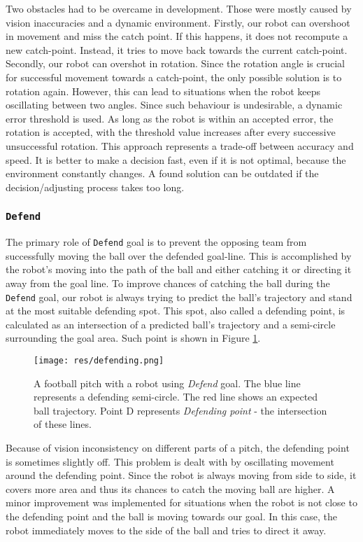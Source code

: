 Two obstacles had to be overcame in development. Those were mostly caused by
vision inaccuracies and a dynamic environment. Firstly, our robot can overshoot
in movement and miss the catch point. If this happens, it does not recompute a
new catch-point. Instead, it tries to move back towards the current
catch-point. Secondly, our robot can overshot in rotation. Since the rotation
angle is crucial for successful movement towards a catch-point, the only
possible solution is to rotation again. However, this can lead to situations
when the robot keeps oscillating between two angles. Since such behaviour is
undesirable, a dynamic error threshold is used. As long as the robot is within
an accepted error, the rotation is accepted, with the threshold value increases
after every successive unsuccessful rotation. This approach represents a
trade-off between accuracy and speed. It is better to make a decision fast,
even if it is not optimal, because the environment constantly changes. A found
solution can be outdated if the decision/adjusting process takes too long.

\subsubsection{\texttt{Defend}}

The primary role of \texttt{Defend} goal is to prevent the opposing team from
successfully moving the ball over the defended goal-line. This is accomplished
by the robot's moving into the path of the ball and either catching it or
directing it away from the goal line. To improve chances of catching the ball
during the \texttt{Defend} goal, our robot is always trying to predict the
ball's trajectory and stand at the most suitable defending spot. This spot,
also called a defending point, is calculated as an intersection of a predicted
ball's trajectory and a semi-circle surrounding the goal area. Such point is
shown in Figure \ref{fig:defendingpoint}.

\begin{figure}[H]
	\begin{center}
    \texttt{[image: res/defending.png]}
    \caption{A football pitch with a robot using \emph{Defend} goal. The blue line represents a defending semi-circle. The red line shows an expected ball trajectory. Point D represents \emph{Defending point} - the intersection of these lines.}
    \label{fig:defendingpoint}
	\end{center}
\end{figure}

Because of vision inconsistency on different parts of a pitch, the defending
point is sometimes slightly off. This problem is dealt with by oscillating
movement around the defending point. Since the robot is always moving from side
to side, it covers more area and thus its chances to catch the moving ball are
higher. A minor improvement was implemented for situations when the robot is not
close to the defending point and the ball is moving towards our goal. In this
case, the robot immediately moves to the side of the ball and tries to direct
it away.
